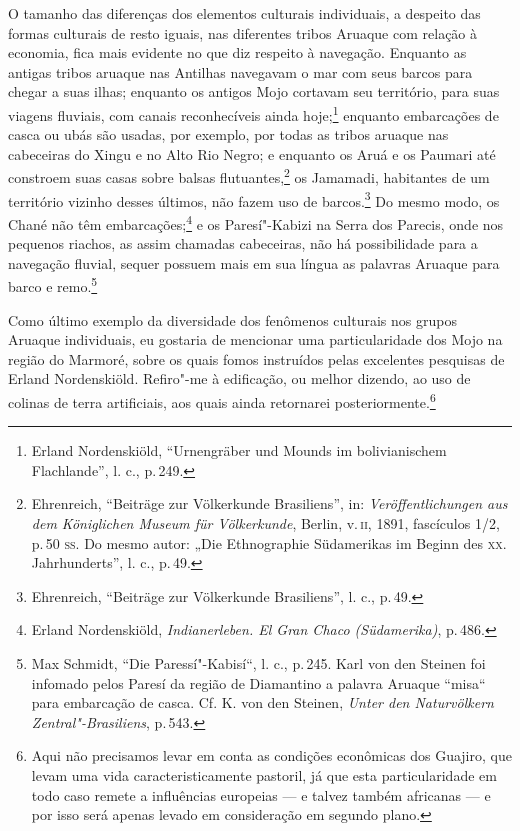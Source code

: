 O tamanho das diferenças dos elementos culturais individuais, a
despeito das formas culturais de resto iguais, nas diferentes tribos
Aruaque com relação à economia, fica mais evidente no que diz respeito
à navegação. Enquanto as antigas tribos aruaque nas Antilhas navegavam
o mar com seus barcos para chegar a suas ilhas; enquanto os antigos Mojo
cortavam seu território, para suas viagens fluviais, com canais
reconhecíveis ainda hoje;\footnote{Erland Nordenskiöld, ``Urnengräber
  und Mounds im bolivianischem Flachlande'', l. c., p.\,249.} enquanto
embarcações de casca ou ubás são usadas, por exemplo, por todas as
tribos aruaque nas cabeceiras do Xingu e no Alto Rio Negro; e enquanto
os Aruá e os Paumari até constroem suas casas sobre balsas
flutuantes,\footnote{Ehrenreich, ``Beiträge zur Völkerkunde Brasiliens'',
  in: \textit{Veröffentlichungen aus dem Königlichen Museum für
  Völkerkunde}, Berlin, v.\,\textsc{ii}, 1891, fascículos 1/2, p.\,50 \textsc{ss}. Do mesmo
  autor: „Die Ethnographie Südamerikas im Beginn des \textsc{xx}.
  Jahrhunderts'', l. c., p.\,49.} os Jamamadi, habitantes de um
território vizinho desses últimos, não fazem uso de barcos.\footnote{Ehrenreich,
  ``Beiträge zur Völkerkunde Brasiliens'', l. c., p.\,49.} Do mesmo
modo, os Chané não têm embarcações;\footnote{Erland Nordenskiöld,
  \textit{Indianerleben. El Gran Chaco (Südamerika)}, p.\,486.} e os
Paresí"-Kabizi na Serra dos Parecis, onde nos pequenos riachos, as assim
chamadas cabeceiras, não há possibilidade para a navegação fluvial,
sequer possuem mais em sua língua as palavras Aruaque para barco e
remo.\footnote{Max Schmidt, ``Die Paressí"-Kabisí``, l. c., p.\,245. Karl
  von den Steinen foi infomado pelos Paresí da região de Diamantino a
  palavra Aruaque ``misa`` para embarcação de casca. Cf. K. von den
  Steinen, \textit{Unter den Naturvölkern Zentral"-Brasiliens}, p.\,543.}

Como último exemplo da diversidade dos fenômenos culturais nos grupos
Aruaque individuais, eu gostaria de mencionar uma particularidade dos
Mojo na região do Marmoré, sobre os quais fomos instruídos pelas
excelentes pesquisas de Erland Nordenskiöld. Refiro"-me à edificação, ou
melhor dizendo, ao uso de colinas de terra artificiais, aos quais ainda
retornarei posteriormente.\footnote{Aqui não precisamos levar em conta as
condições econômicas dos Guajiro, que levam uma vida
caracteristicamente pastoril, já que esta particularidade em todo caso
remete a influências europeias --- e talvez também africanas --- e por
isso será apenas levado em consideração em segundo plano.}


